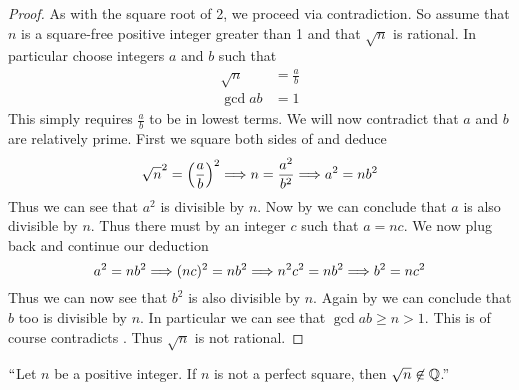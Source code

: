         \begin{proof}
            As with the square root of 2, we proceed via contradiction. So assume that $n$
            is a square-free positive integer greater than 1 and that $\sqrt{n}$ is rational.
            In particular choose integers $a$ and $b$ such that
            \begin{align}
                \label{Square-root irrational proof eq 1}
                \sqrt{n} &= \frac{a}{b} \\
                \gcd{a}{b} &= 1
                \label{Square-root irrational proof eq 2}
            \end{align}
            This simply requires $\frac{a}{b}$ to be in lowest terms. We will now contradict
            that $a$ and $b$ are relatively prime. First we square both sides of
             and deduce
            \[
                \sqrt{n}^2 = \left( \frac{a}{b}\right)^2 \Longrightarrow
                n = \frac{a^2}{b^2} \Longrightarrow
                a^2 = nb^2
            \]
            Thus we can see that $a^2$ is divisible by $n$. Now by
             we can conclude that $a$ is
            also divisible by $n$. Thus there must by an integer $c$ such that
            $a = nc$. We now plug back and continue our deduction
            \[
                a^2 = nb^2 \Longrightarrow
                (nc)^2 = nb^2 \Longrightarrow
                n^2c^2 = nb^2 \Longrightarrow
                b^2 = nc^2
            \]
            Thus we can now see that $b^2$ is also divisible by $n$. Again by
             we can conclude that $b$ too
            is divisible by $n$. In particular we can see that $\gcd{a}{b} \ge n > 1$.
            This is of course contradicts
            .
            Thus $\sqrt{n}$ is not rational. \QED
        \end{proof}
        \begin{corollary}
            $``$Let $n$ be a positive integer. If $n$ is not a perfect square, then
            $\sqrt{n} \not\in \mathbb{Q}$.''
        \end{corollary}
